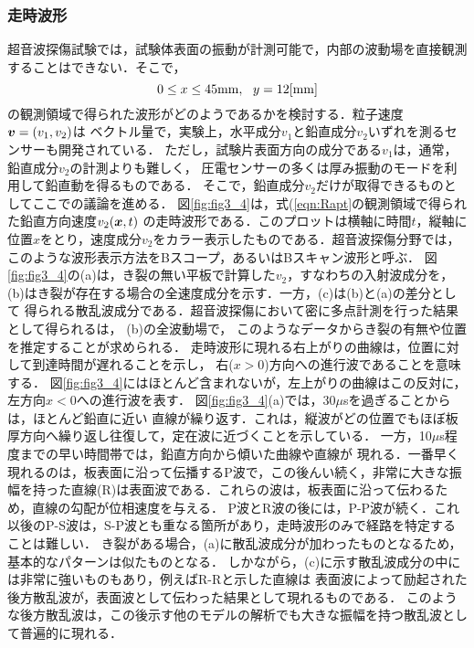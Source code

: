\subsubsection{走時波形}
超音波探傷試験では，試験体表面の振動が計測可能で，内部の波動場を直接観測
することはできない．そこで，
\begin{equation}
	0\leq x \leq 45{\rm mm} , \ \ y=12[{\rm mm}]
	\label{eqn:Rapt}
\end{equation}
の観測領域で得られた波形がどのようであるかを検討する．粒子速度$\mbox{\boldmath $v$}=(v_1, v_2)$は
ベクトル量で，実験上，水平成分$v_1$と鉛直成分$v_2$いずれを測るセンサーも開発されている．
ただし，試験片表面方向の成分である$v_1$は，通常，鉛直成分$v_2$の計測よりも難しく，
圧電センサーの多くは厚み振動のモードを利用して鉛直動を得るものである．
そこで，鉛直成分$v_2$だけが取得できるものとしてここでの議論を進める．
図\ref{fig:fig3_4}は，式(\ref{eqn:Rapt}の観測領域で得られた鉛直方向速度$v_2(\mbox{\boldmath $x$},t)$
の走時波形である．このプロットは横軸に時間$t$，縦軸に位置$x$をとり，速度成分$v_2$をカラー表示したものである．超音波探傷分野では，このような波形表示方法をBスコープ，あるいはBスキャン波形と呼ぶ．
図\ref{fig:fig3_4}の(a)は，き裂の無い平板で計算した$v_2$，すなわちの入射波成分を，
(b)はき裂が存在する場合の全速度成分を示す．一方，(c)は(b)と(a)の差分として
得られる散乱波成分である．超音波探傷において密に多点計測を行った結果として得られるは，
(b)の全波動場で， このようなデータからき裂の有無や位置を推定することが求められる．
走時波形に現れる右上がりの曲線は，位置に対して到達時間が遅れることを示し，
右($x>0$)方向への進行波であることを意味する．
図\ref{fig:fig3_4}にはほとんど含まれないが，左上がりの曲線はこの反対に，左方向$x<0$への進行波を表す．
図\ref{fig:fig3_4}(a)では，30$\mu$sを過ぎることからは，ほとんど鉛直に近い
直線が繰り返す．これは，縦波がどの位置でもほぼ板厚方向へ繰り返し往復して，定在波に近づくことを示している．
一方，10$\mu$s程度までの早い時間帯では，鉛直方向から傾いた曲線や直線が
現れる．一番早く現れるのは，板表面に沿って伝播するP波で，この後んい続く，非常に大きな振幅を持った直線(R)は表面波である．これらの波は，板表面に沿って伝わるため，直線の勾配が位相速度を与える．
P波とR波の後には，P-P波が続く．これ以後のP-S波は，S-P波とも重なる箇所があり，走時波形のみで経路を特定することは難しい．
き裂がある場合，(a)に散乱波成分が加わったものとなるため，基本的なパターンは似たものとなる．
しかながら，(c)に示す散乱波成分の中には非常に強いものもあり，例えばR-Rと示した直線は
表面波によって励起された後方散乱波が，表面波として伝わった結果として現れるものである．
このような後方散乱波は，この後示す他のモデルの解析でも大きな振幅を持つ散乱波として普遍的に現れる．

